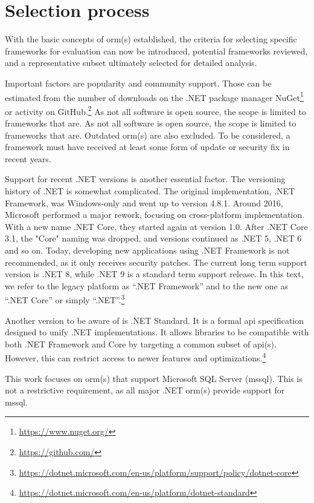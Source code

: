 \section{Selection process}
With the basic concepts of \acrshort{orm}(s) established, the criteria for selecting specific frameworks for evaluation can now be introduced, potential frameworks reviewed, and a representative subset ultimately selected for detailed analysis.

Important factors are popularity and community support. Those can be estimated from the number of downloads on the .NET package manager NuGet\footnote{\url{https://www.nuget.org/}} or activity on GitHub.\footnote{\url{https://github.com/}} As not all software is open source, the scope is limited to frameworks that are. As not all software is open source, the scope is limited to frameworks that are. Outdated \acrshort{orm}(s) are also excluded. To be considered, a framework must have received at least some form of update or security fix in recent years.

Support for recent .NET versions is another essential factor. The versioning history of .NET is somewhat complicated. The original implementation, .NET Framework, was Windows-only and went up to version 4.8.1. Around 2016, Microsoft performed a major rework, focusing on cross-platform implementation. With a new name .NET Core, they started again at version 1.0. After .NET Core 3.1, the "Core" naming was dropped, and versions continued as .NET 5, .NET 6 and so on. Today, developing new applications using .NET Framework is not recommended, as it only receives security patches. The current long term support version is .NET 8, while .NET 9 is a standard term support release. In this text, we refer to the legacy platform as ``.NET Framework'' and to the new one as ``.NET Core'' or simply ``.NET''.\footnote{\url{https://dotnet.microsoft.com/en-us/platform/support/policy/dotnet-core}}%

Another version to be aware of is .NET Standard. It is a formal \acrshort{api} specification designed to unify .NET implementations. It allows libraries to be compatible with both .NET Framework and Core by targeting a common subset of \acrshort{api}(s). However, this can restrict access to newer features and optimizations.\footnote{\url{https://dotnet.microsoft.com/en-us/platform/dotnet-standard}}

This work focuses on \acrshort{orm}(s) that support Microsoft SQL Server (\acrshort{mssql}). This is not a restrictive requirement, as all major .NET \acrshort{orm}(s) provide support for \acrshort{mssql}.

